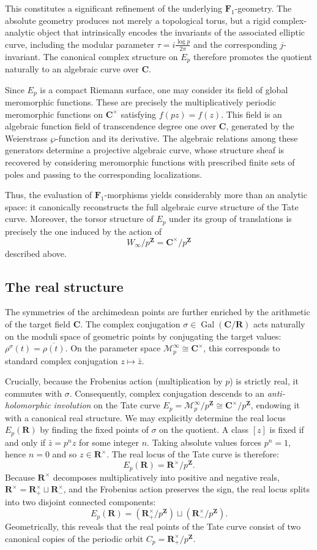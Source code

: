 \documentclass[11pt,a4paper]{article}
\newcommand{\C}{\mathbf{C}}
\newcommand{\R}{\mathbf{R}}
\newcommand{\Z}{\mathbf{Z}}
\newcommand{\Fone}{\mathbf{F}_{1}}
\begin{document}
This constitutes a significant refinement of the underlying $\Fone$-geometry. The absolute geometry produces not merely a topological torus, but a rigid complex-analytic object that intrinsically encodes the invariants of the associated elliptic curve, including the modular parameter
$\tau=i\frac{\log p}{2\pi}$
and the corresponding $j$-invariant. The canonical complex structure on $E_p$ therefore promotes the quotient naturally to an algebraic curve over $\C$.

Since $E_p$ is a compact Riemann surface, one may consider its field of global meromorphic functions. These are precisely the multiplicatively periodic meromorphic functions on $\C^\times$ satisfying
$f(pz)=f(z)$.
This field is an algebraic function field of transcendence degree one over $\C$, generated by the Weierstrass $\wp$-function and its derivative. The algebraic relations among these generators determine a projective algebraic curve, whose structure sheaf is recovered by considering meromorphic functions with prescribed finite sets of poles and passing to the corresponding localizations.

Thus, the evaluation of $\Fone$-morphisms yields considerably more than an analytic space: it canonically reconstructs the full algebraic curve structure of the Tate curve. Moreover, the torsor structure of $E_p$ under its group of translations is precisely the one induced by the action of
\[
W_\infty/p^\Z=\C^\times/p^\Z
\]
described above.


\subsection{The real structure}
The symmetries of the archimedean points are further enriched by the arithmetic of the target field $\C$. The complex conjugation $\sigma \in \operatorname{Gal}(\C/\R)$ acts naturally on the moduli space of geometric points by conjugating the target values: $\rho^\sigma(t) = \overline{\rho(t)}$. On the parameter space $\mathcal{M}_{p}^{\infty}\cong\C^\times$, this corresponds to standard complex conjugation $z \mapsto \bar{z}$. 

Crucially, because the Frobenius action (multiplication by $p$) is strictly real, it commutes with $\sigma$. Consequently, complex conjugation descends to an \emph{anti-holomorphic involution} on the Tate curve $E_p =\mathcal{M}_{p}^{\infty}/p^\Z\cong \C^\times / p^\Z$, endowing it with a canonical real structure. We may explicitly determine the real locus $E_p(\R)$ by finding the fixed points of $\sigma$ on the quotient. A class $[z]$ is fixed if and only if $\bar{z} = p^n z$ for some integer $n$. Taking absolute values forces $p^n = 1$, hence $n=0$ and so $z \in \R^\times$. 
The real locus of the Tate curve is therefore:
\[
E_p(\R) = \R^\times / p^\Z.
\]
Because $\R^\times$ decomposes multiplicatively into positive and negative reals, $\R^\times = \R_+^\times \sqcup \R_-^\times$, and the Frobenius action preserves the sign, the real locus splits into two disjoint connected components:
\[
E_p(\R) = (\R_+^\times / p^\Z) \sqcup (\R_-^\times / p^\Z).
\]
Geometrically, this reveals that the real points of the Tate curve consist of  two canonical copies of the periodic orbit $C_p = \R_+^\times / p^\Z$. 
\end{document}
